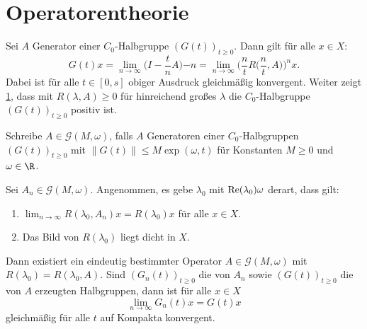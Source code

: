 

\section{Operatorentheorie}

\begin{prop}
Sei $A$ Generator einer $C_0$-Halbgruppe $(G(t))_{t\geq0}$. Dann gilt für alle $x\in X$:
\begin{equation}
G(t)x = \lim_{n\to\infty}\Bigg(I- \frac t n A\Bigg){-n} = \lim_{n\to\infty} \Bigg(\frac n t R\Bigg(\frac n t, A\Bigg)\Bigg)^n x.
\end{equation}
Dabei ist für alle $t\in[0, s]$ obiger Ausdruck gleichmäßig konvergent. Weiter zeigt \ref{}, dass mit $R(\lambda, A)\geq0$ für hinreichend großes $\lambda$ die $C_0$-Halbgruppe $(G(t))_{t\geq0}$ positiv ist.
\end{prop}

\begin{defi}
Schreibe $A\in\mathcal G(M, \omega)$, falls $A$  Generatoren einer  $C_0$-Halbgruppen $(G(t))_{t\geq0}$ mit $\|G(t)\|\leq M\exp(\omega, t)$ für Konstanten $M\geq0$ und $\omega\in \R$.
\end{defi}

\begin{fsatz}\cite{}\label{Trotter-Kato} 
Sei $A_n\in \mathcal G(M,\omega)$. Angenommen, es gebe $\lambda_0$ mit $\textnormal{Re}(\lambda_0) \omega$ derart, dass gilt:
\begin{enumerate}
\item $\lim_{n\to\infty}R(\lambda_0, A_n)x = R(\lambda_0)x$ für alle $x\in X$.
\item Das Bild von $R(\lambda_0)$ liegt dicht in $X$.
\end{enumerate}
Dann existiert ein eindeutig bestimmter Operator $A\in\mathcal G(M, \omega)$ mit $R(\lambda_0)=R(\lambda_0, A)$. Sind $(G_n(t))_{t\geq0}$ die von $A_n$  sowie $(G(t))_{t\geq0}$ die von $A$ erzeugten Halbgruppen, dann ist für alle $x\in X$
\begin{equation}
\lim_{n\to\infty}G_n(t)x=G(t)x
\end{equation}
gleichmäßig für alle $t$ auf Kompakta konvergent.
\end{fsatz}

